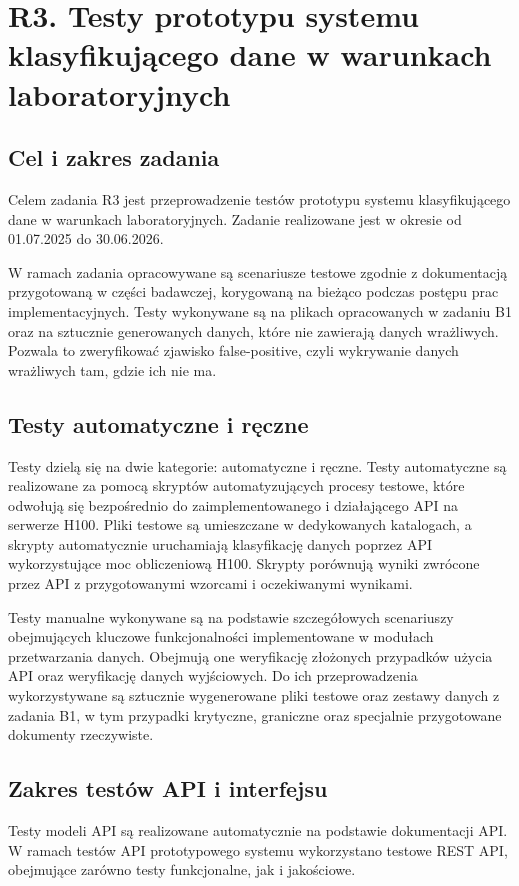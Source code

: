 \documentclass[12pt,a4paper]{report}
\begin{document}
\section{R3. Testy prototypu systemu klasyfikującego dane w warunkach laboratoryjnych}
\subsection{Cel i zakres zadania}
Celem zadania R3 jest przeprowadzenie testów prototypu systemu klasyfikującego dane w warunkach laboratoryjnych. Zadanie realizowane jest w okresie od 01.07.2025 do 30.06.2026.

W ramach zadania opracowywane są scenariusze testowe zgodnie z dokumentacją przygotowaną w części badawczej, korygowaną na bieżąco podczas postępu prac implementacyjnych. Testy wykonywane są na plikach opracowanych w zadaniu B1 oraz na sztucznie generowanych danych, które nie zawierają danych wrażliwych. Pozwala to zweryfikować zjawisko false-positive, czyli wykrywanie danych wrażliwych tam, gdzie ich nie ma.

\subsection{Testy automatyczne i ręczne}
Testy dzielą się na dwie kategorie: automatyczne i ręczne. Testy automatyczne są realizowane za pomocą skryptów automatyzujących procesy testowe, które odwołują się bezpośrednio do zaimplementowanego i działającego API na serwerze H100. Pliki testowe są umieszczane w dedykowanych katalogach, a skrypty automatycznie uruchamiają klasyfikację danych poprzez API wykorzystujące moc obliczeniową H100. Skrypty porównują wyniki zwrócone przez API z przygotowanymi wzorcami i oczekiwanymi wynikami.

Testy manualne wykonywane są na podstawie szczegółowych scenariuszy obejmujących kluczowe funkcjonalności implementowane w modułach przetwarzania danych. Obejmują one weryfikację złożonych przypadków użycia API oraz weryfikację danych wyjściowych. Do ich przeprowadzenia wykorzystywane są sztucznie wygenerowane pliki testowe oraz zestawy danych z zadania B1, w tym przypadki krytyczne, graniczne oraz specjalnie przygotowane dokumenty rzeczywiste.

\subsection{Zakres testów API i interfejsu}
Testy modeli API są realizowane automatycznie na podstawie dokumentacji API. W ramach testów API prototypowego systemu wykorzystano testowe REST API, obejmujące zarówno testy funkcjonalne, jak i jakościowe.
\end{document}

